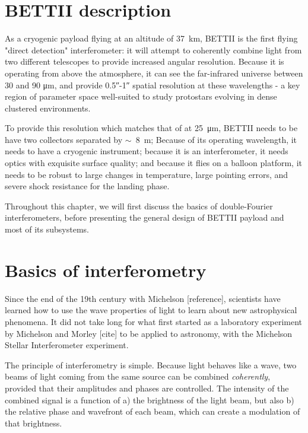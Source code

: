 \section{BETTII description}

As a cryogenic payload flying at an altitude of \SI{37}{\kilo\meter}, BETTII is the first flying "direct detection" interferometer: it will attempt to coherently combine light from two different telescopes to provide increased angular resolution. Because it is operating from above the atmosphere, it can see the far-infrared universe between 30 and 90 \si{\micro\meter}, and provide \ang{;;0.5}-\ang{;;1} spatial resolution at these wavelengths - a key region of parameter space well-suited to study protostars evolving in dense clustered environments.

To provide this resolution which matches that of \JWST  at \SI{25}{\micro\meter}, BETTII needs to be have two collectors separated by $\sim$~\SI{8}{\meter}; Because of its operating wavelength, it needs to have a cryogenic instrument; because it is an interferometer, it needs optics with exquisite surface quality; and because it flies on a balloon platform, it needs to be robust to large changes in temperature, large pointing errors, and severe shock resistance for the landing phase.

Throughout this chapter, we will first discuss the basics of double-Fourier interferometers, before presenting the general design of BETTII payload and most of its subsystems.


\section{Basics of interferometry}

Since the end of the 19th century with Michelson [reference], scientists have learned how to use the wave properties of light to learn about new astrophysical phenomena. It did not take long for what first started as a laboratory experiment by Michelson and Morley [cite] to be applied to astronomy, with the Michelson Stellar Interferometer experiment. 

The principle of interferometry is simple. Because light behaves like a wave, two beams of light coming from the same source can be combined \textit{coherently}, provided that their amplitudes and phases are controlled. The intensity of the combined signal is a function of a) the brightness of the light beam, but also b) the relative phase and wavefront of each beam, which can create a modulation of that brightness.

